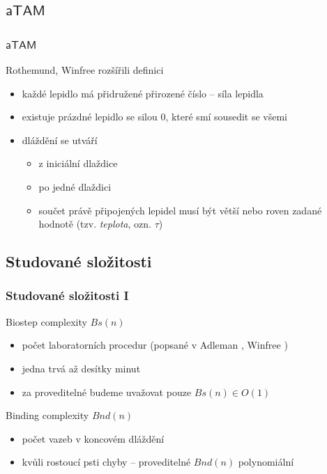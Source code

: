 \documentclass[10pt]{beamer}
\newcommand{\atam}{\mathsf{aTAM}}
\theoremstyle{definition}
\theoremstyle{remark}
\begin{document}
\subsection{$\atam$}
\begin{frame}
\frametitle{$\atam$}
	Rothemund, Winfree rozšířili definici
	\begin{itemize}
		\item každé lepidlo má přidružené přirozené číslo -- síla lepidla
		\item existuje prázdné lepidlo se silou 0, které smí sousedit se všemi
		\item dláždění se utváří
		\begin{itemize}
			\item z iniciální dlaždice
			\item po jedné dlaždici
			\item součet právě připojených lepidel musí být větší nebo roven zadané hodnotě (tzv. {\em teplota}, ozn. $\tau$)
		\end{itemize}
	\end{itemize}
\end{frame}

\subsection{Studované složitosti}
\begin{frame}
\frametitle{Studované složitosti I}
	Biostep complexity $Bs(n)$
	\begin{itemize}
		\item počet laboratorních procedur (popsané v Adleman \cite{adleman95biostep}, Winfree \cite{winfree_phd})
		\item jedna trvá až desítky minut
		\item za proveditelné budeme uvažovat pouze $Bs(n) \in O(1)$
	\end{itemize}
	Binding complexity $Bnd(n)$
	\begin{itemize}
		\item počet vazeb v koncovém dláždění
		\item kvůli rostoucí psti chyby -- proveditelné $Bnd(n)$ polynomiální
	\end{itemize}
\end{frame}
\end{document}
